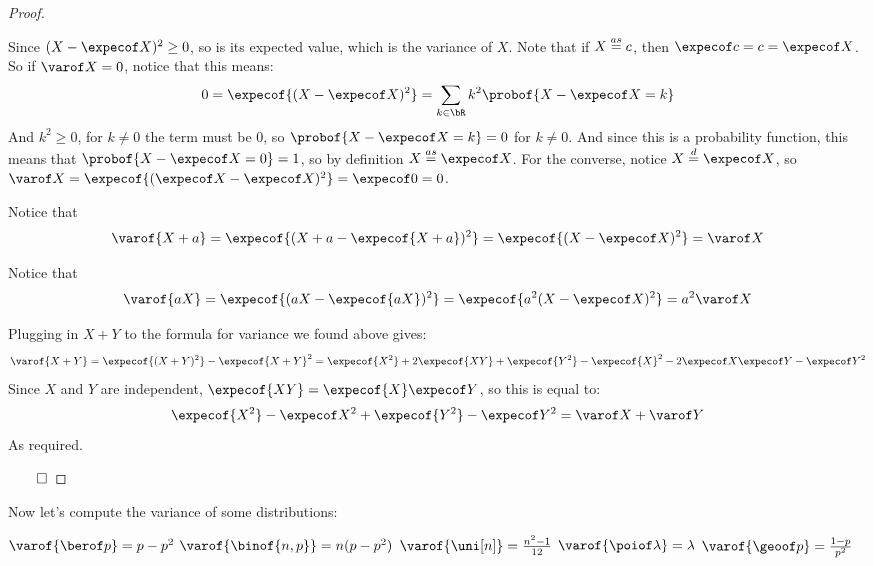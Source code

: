 \begin{proof}

	\begin{msecenumerate}[0pt]
		\mitem Since $(X-\expecof X)^2\geq0$, so is its expected value, which is the variance of $X$.
		\mitem Note that if $X\mathrel{\overset{as}=} c$, then $\expecof c=c=\expecof X$.
		So if $\varof X=0$, notice that this means:
		\[ 0 = \expecof{(X-\expecof X)^2} = \sum_{k\in\bR}k^2\probof{X-\expecof X=k} \]
		And $k^2\geq0$, for $k\neq0$ the term must be $0$, so $\probof{X-\expecof X=k}=0$ for $k\neq0$.
		And since this is a probability function, this means that $\probof{X-\expecof X=0}=1$, so by definition
		$X\aseq\expecof X$.
		For the converse, notice $X\deq\expecof X$, so $\varof X=\expecof{(\expecof X-\expecof X)^2}=\expecof0=0$.

		\mitem Notice that 
		\[ \varof{X+a}=\expecof{(X+a-\expecof{X+a})^2}=\expecof{(X-\expecof X)^2}=\varof X \]

		\mitem Notice that
		\[ \varof{aX} = \expecof{(aX-\expecof{aX})^2} = \expecof{a^2(X-\expecof X)^2} = a^2\varof X \]

		\mitem Plugging in $X+Y$ to the formula for variance we found above gives:
		\[ \varof{X+Y} = \expecof{(X+Y)^2} - \expecof{X+Y}^2 = \expecof{X^2} + 2\expecof{XY} + \expecof{Y^2} -
		\expecof{X}^2 - 2\expecof X\expecof Y - \expecof Y^2 \]
		Since $X$ and $Y$ are independent, $\expecof{XY}=\expecof{X}\expecof Y$, so this is equal to:
		\[ \expecof{X^2} - \expecof X^2 + \expecof{Y^2} - \expecof Y^2 = \varof X+\varof Y \]
		As required.
	\end{msecenumerate}

	\hfill$\qed$

\end{proof}

Now let's compute the variance of some distributions:

\begin{prop*}

	\begin{msecenumerate}[0pt]
		\mitem $\varof{\berof p}=p-p^2$
		\mitem $\varof{\binof{n,p}}=n(p-p^2)$
		\mitem $\varof{\uni[n]}=\frac{n^2-1}{12}$
		\mitem $\varof{\poiof\lambda}=\lambda$
		\mitem $\varof{\geoof p}=\frac{1-p}{p^2}$
	\end{msecenumerate}

\end{prop*}

